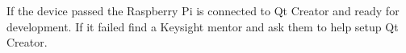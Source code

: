\documentclass{article}
\begin{document}
If the device passed the Raspberry Pi is connected to Qt Creator and ready for development. If it failed find a Keysight mentor and ask them to help setup Qt Creator.




	
	







\end{document}

